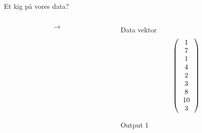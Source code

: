 \documentclass[12pt,t]{beamer}
\begin{document}
\begin{frame}[c]{Et kig på vores data?}
\begin{columns}
            \begin{column}{0.08\textwidth}
                \vspace{4em}
                \begin{Huge}
                    $$
                        \rightarrow
                    $$
                \end{Huge}
            \end{column}
            \begin{column}{0.3\textwidth}
                \vspace{-1.8em}
                \begin{block}{Data vektor}
                    $$
                        \left(
                        \begin{tabular}{c}
                            1      \\
                            7      \\
                            1      \\
                            4      \\
                            2      \\
                            3      \\
                            8      \\
                            10     \\
                            3
                        \end{tabular}
                        \right)
                    $$
                \end{block}
                \vspace{-0.9em}
                \begin{block}{Output}
                    \centering \alert{1}
                \end{block}
            \end{column}
        \end{columns}
    \end{frame}
\end{document}

